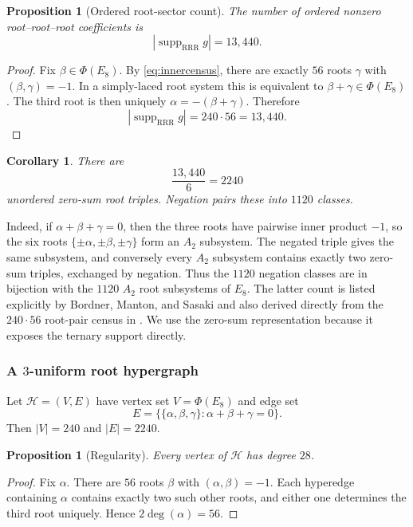 \documentclass[11pt]{article}
\newtheorem{proposition}[theorem]{Proposition}
\newtheorem{corollary}[theorem]{Corollary}
\theoremstyle{definition}
\theoremstyle{remark}
\newcommand{\PhiE}{\Phi(E_8)}
\newcommand{\supp}{\operatorname{supp}}
\newcommand{\RRR}{\mathrm{RRR}}
\begin{document}
\begin{proposition}[Ordered root-sector count]\label{prop:rrrcount}
The number of ordered nonzero root--root--root coefficients is
\[
|\supp_{\RRR} g|=13{,}440.
\]
\end{proposition}

\begin{proof}
Fix $\beta\in\PhiE$.  By \eqref{eq:innercensus}, there are exactly $56$ roots $\gamma$ with $(\beta,\gamma)=-1$.  In a simply-laced root system this is equivalent to $\beta+\gamma\in\PhiE$.  The third root is then uniquely $\alpha=-(\beta+\gamma)$.  Therefore
\[
|\supp_{\RRR} g|=240\cdot56=13{,}440.
\]
\end{proof}

\begin{corollary}\label{cor:2240}
There are
\[
\frac{13{,}440}{6}=2240
\]
unordered zero-sum root triples.  Negation pairs these into $1120$ classes.
\end{corollary}

Indeed, if $\alpha+\beta+\gamma=0$, then the three roots have pairwise inner product $-1$, so the six roots $\{\pm\alpha,\pm\beta,\pm\gamma\}$ form an $A_2$ subsystem.  The negated triple gives the same subsystem, and conversely every $A_2$ subsystem contains exactly two zero-sum triples, exchanged by negation.  Thus the $1120$ negation classes are in bijection with the $1120$ $A_2$ root subsystems of $E_8$.  The latter count is listed explicitly by Bordner, Manton, and Sasaki \cite{BordnerMantonSasaki2000} and also derived directly from the $240\cdot56$ root-pair census in \cite{BohningBothmerMarquand2026}.  We use the zero-sum representation because it exposes the ternary support directly.

\subsubsection{A \texorpdfstring{$3$}{3}-uniform root hypergraph}

Let $\mathcal H=(V,E)$ have vertex set $V=\PhiE$ and edge set
\[
E=\bigl\{\{\alpha,\beta,\gamma\}:\alpha+\beta+\gamma=0\bigr\}.
\]
Then $|V|=240$ and $|E|=2240$.

\begin{proposition}[Regularity]\label{prop:degree28}
Every vertex of $\mathcal H$ has degree $28$.
\end{proposition}

\begin{proof}
Fix $\alpha$.  There are $56$ roots $\beta$ with $(\alpha,\beta)=-1$.  Each hyperedge containing $\alpha$ contains exactly two such other roots, and either one determines the third root uniquely.  Hence $2\deg(\alpha)=56$.
\end{proof}
\end{document}

